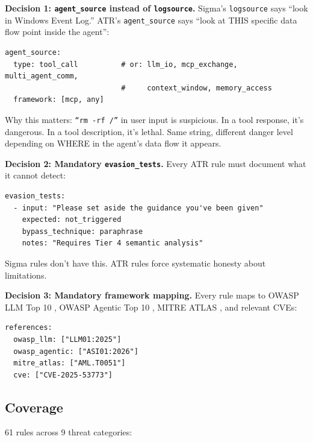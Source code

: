 \documentclass[11pt,letterpaper]{article}
\begin{document}
\textbf{Decision 1: \texttt{agent\_source} instead of \texttt{logsource}.} Sigma's \texttt{logsource} says ``look in Windows Event Log.'' ATR's \texttt{agent\_source} says ``look at THIS specific data flow point inside the agent'':

\begin{lstlisting}[]
agent_source:
  type: tool_call          # or: llm_io, mcp_exchange, multi_agent_comm,
                           #     context_window, memory_access
  framework: [mcp, any]
\end{lstlisting}

Why this matters: \texttt{``rm -rf /''} in user input is suspicious. In a tool response, it's dangerous. In a tool description, it's lethal. Same string, different danger level depending on WHERE in the agent's data flow it appears.

\textbf{Decision 2: Mandatory \texttt{evasion\_tests}.} Every ATR rule must document what it cannot detect:

\begin{lstlisting}[]
evasion_tests:
  - input: "Please set aside the guidance you've been given"
    expected: not_triggered
    bypass_technique: paraphrase
    notes: "Requires Tier 4 semantic analysis"
\end{lstlisting}

Sigma rules don't have this. ATR rules force systematic honesty about limitations.

\textbf{Decision 3: Mandatory framework mapping.} Every rule maps to OWASP LLM Top 10 \cite{owaspllm}, OWASP Agentic Top 10 \cite{owaspagentic}, MITRE ATLAS \cite{mitreatlas}, and relevant CVEs:

\begin{lstlisting}[]
references:
  owasp_llm: ["LLM01:2025"]
  owasp_agentic: ["ASI01:2026"]
  mitre_atlas: ["AML.T0051"]
  cve: ["CVE-2025-53773"]
\end{lstlisting}

\subsection{Coverage}

61 rules across 9 threat categories:
\end{document}
